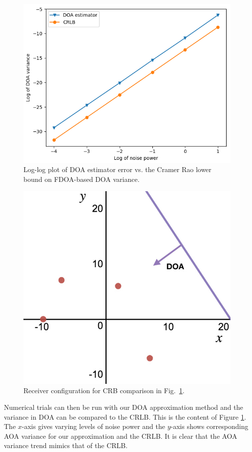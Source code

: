 \begin{figure}
  \includegraphics[scale=0.8]{CRLBcompare}
  \caption{Log-log plot of DOA estimator error vs. the Cramer Rao lower bound on FDOA-based DOA variance. }
  \label{CRLB}
\end{figure}

\begin{figure}
  \includegraphics[scale=0.3]{sensor_config_arrow}
  \caption{Receiver configuration for CRB comparison in Fig.~\ref{CRLB}.}
  \label{config}
\end{figure}

Numerical trials can then be run with our DOA approximation method and the variance in DOA can be compared to the CRLB. This is the content of Figure \ref{CRLB}. The $x$-axis gives varying levels of noise power and the $y$-axis shows corresponding AOA variance for our approximation and the CRLB. It is clear that the AOA variance trend mimics that of the CRLB.
